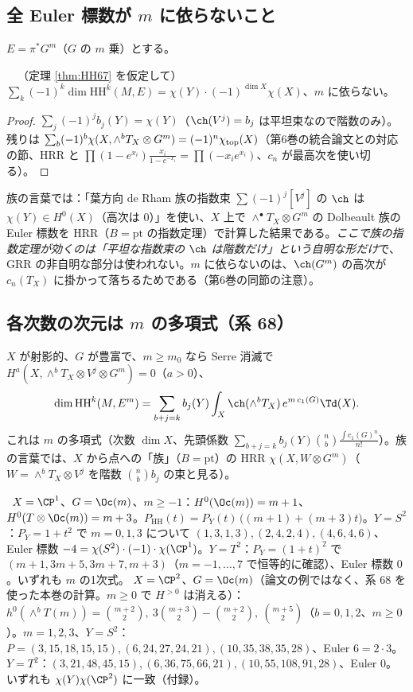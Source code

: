 \subsection{全 Euler 標数が $m$ に依らないこと}
$E=\pi^*G^m$（$G$ の $m$ 乗）とする。
\begin{prop}\label{prop:EulerMfam}\tP\ \tC\ （定理 \ref{thm:HH67} を仮定して）
$\displaystyle\sum_k(-1)^k\dim\mathrm{HH}^k(M,E)=\chi(Y)\cdot(-1)^{\dim X}\chi(X)$、$m$ に依らない。
\end{prop}
\begin{proof}
$\sum_j(-1)^jb_j(Y)=\chi(Y)$（$\ch(V^j)=b_j$ は平坦束なので階数のみ）。残りは $\sum_b(-1)^b\chi(X,\wedge^bT_X\otimes G^m)=(-1)^n\chi_{\rm top}(X)$（第6巻の統合論文との対応の節、HRR と $\prod(1-e^{x_i})\frac{x_i}{1-e^{-x_i}}=\prod(-x_ie^{x_i})$、$c_n$ が最高次を使い切る）。
\end{proof}
族の言葉では：「葉方向 de Rham 族の指数束 $\sum(-1)^j[V^j]$ の $\ch$ は $\chi(Y)\in H^0(X)$（高次は $0$）」を使い、$X$ 上で $\wedge^\bullet T_X\otimes G^m$ の Dolbeault 族の Euler 標数を HRR（$B=\mathrm{pt}$ の指数定理）で計算した結果である。\emph{ここで族の指数定理が効くのは「平坦な指数束の $\ch$ は階数だけ」という自明な形だけ}で、GRR の非自明な部分は使われない。$m$ に依らないのは、$\ch(G^m)$ の高次が $c_n(T_X)$ に掛かって落ちるためである（第6巻の同節の注意）。

\subsection{各次数の次元は $m$ の多項式（系 68）}
$X$ が射影的、$G$ が豊富で、$m\ge m_0$ なら Serre 消滅で $H^a(X,\wedge^bT_X\otimes V^j\otimes G^m)=0$（$a>0$）、
\[
\dim\mathrm{HH}^k(M,E^m)=\sum_{b+j=k}b_j(Y)\int_X\ch(\wedge^bT_X)\,e^{m\,c_1(G)}\Td(X).
\]
これは $m$ の多項式（次数 $\dim X$、先頭係数 $\sum_{b+j=k}b_j(Y)\binom{n}{b}\frac{\int c_1(G)^n}{n!}$）。族の言葉では、$X$ から点への「族」（$B=\mathrm{pt}$）の HRR $\chi(X,W\otimes G^m)$（$W=\wedge^bT_X\otimes V^j$ を階数 $\binom nb b_j$ の束と見る）。
\begin{ex}\label{ex:poly}\tP\
$X=\CP^1$、$G=\Oc(m)$、$m\ge-1$：$H^0(\Oc(m))=m+1$、$H^0(T\otimes\Oc(m))=m+3$。$P_{\mathrm{HH}}(t)=P_Y(t)\,\bigl((m+1)+(m+3)t\bigr)$。$Y=S^2$：$P_Y=1+t^2$ で $m=0,1,3$ について $(1,3,1,3),(2,4,2,4),(4,6,4,6)$、Euler 標数 $-4=\chi(S^2)\cdot(-1)\cdot\chi(\CP^1)$。$Y=T^2$：$P_Y=(1+t)^2$ で $(m+1,3m+5,3m+7,m+3)$（$m=-1,\dots,7$ で恒等的に確認）、Euler 標数 $0$。いずれも $m$ の1次式。
$X=\CP^2$、$G=\Oc(m)$（論文の例ではなく、系 68 を使った本巻の計算。$m\ge0$ で $H^{>0}$ は消える）：$h^0(\wedge^bT(m))=\binom{m+2}2,\ 3\binom{m+3}2-\binom{m+2}2,\ \binom{m+5}2$（$b=0,1,2$、$m\ge0$）。$m=1,2,3$、$Y=S^2$：$P=(3,15,18,15,15),(6,24,27,24,21),(10,35,38,35,28)$、Euler $6=2\cdot3$。$Y=T^2$：$(3,21,48,45,15),(6,36,75,66,21),(10,55,108,91,28)$、Euler $0$。いずれも $\chi(Y)\chi(\CP^2)$ に一致（付録）。
\end{ex}

